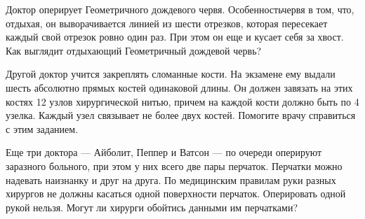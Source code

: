 ﻿
\begin{itemize}

\itA Доктор оперирует Геометричного дождевого червя. Особенность\linebreak червя в том, что, отдыхая, он выворачивается линией из шести отрезков, которая пересекает каждый свой отрезок ровно один раз. При этом он еще и кусает себя за хвост. Как выглядит отдыхающий Геометричный дождевой червь?

\itB Другой доктор учится закреплять сломанные кости. На экзамене ему выдали шесть абсолютно прямых костей одинаковой длины. Он должен завязать на этих костях 12 узлов хирургической нитью, причем на каждой кости должно быть по 4 узелка. Каждый узел связывает не более двух костей. Помогите врачу справиться с этим заданием.

\itC Еще три доктора — Айболит, Пеппер и Ватсон — по очереди оперируют заразного больного, при этом у них всего две пары перчаток. Перчатки можно надевать наизнанку и друг на друга. По медицинским правилам руки разных хирургов не должны касаться одной поверхности перчаток. Оперировать одной рукой нельзя. Могут ли хирурги обойтись данными им перчатками?
\end{itemize}
